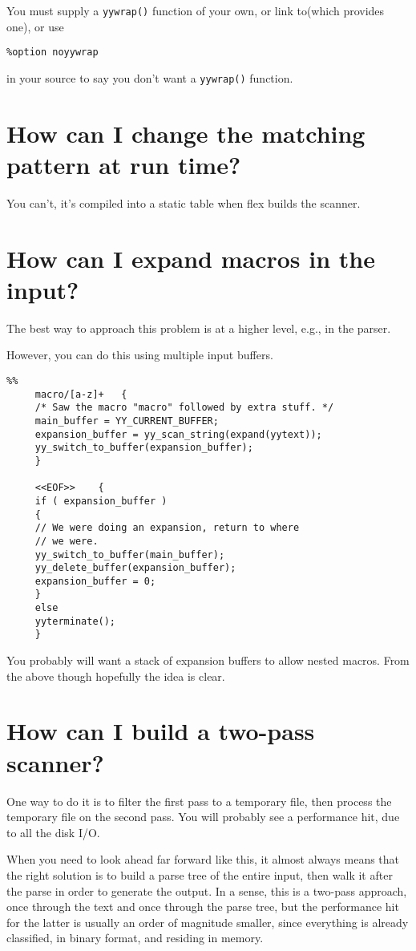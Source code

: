 \documentclass[openany,oneside]{book}
\begin{document}
You must supply a \verb`yywrap()` function of your own, or link to(which provides one), or use
\begin{verbatim}
%option noyywrap
\end{verbatim}


in your source to say you don't want a \verb`yywrap()` function.
\section{How can I change the matching pattern at run time?}


You can't, it's compiled into a static table when flex builds the scanner.
\section{How can I expand macros in the input?}


The best way to approach this problem is at a higher level, e.g., in the parser.

However, you can do this using multiple input buffers.
\begin{verbatim}
%%
     macro/[a-z]+	{
     /* Saw the macro "macro" followed by extra stuff. */
     main_buffer = YY_CURRENT_BUFFER;
     expansion_buffer = yy_scan_string(expand(yytext));
     yy_switch_to_buffer(expansion_buffer);
     }
     
     <<EOF>>	{
     if ( expansion_buffer )
     {
     // We were doing an expansion, return to where
     // we were.
     yy_switch_to_buffer(main_buffer);
     yy_delete_buffer(expansion_buffer);
     expansion_buffer = 0;
     }
     else
     yyterminate();
     }
\end{verbatim}


You probably will want a stack of expansion buffers to allow nested macros. 
From the above though hopefully the idea is clear.
\section{How can I build a two-pass scanner?}


One way to do it is to filter the first pass to a temporary file,
then process the temporary file on the second pass. You will probably see a
performance hit, due to all the disk I/O.

When you need to look ahead far forward like this, it almost always means
that the right solution is to build a parse tree of the entire input, then
walk it after the parse in order to generate the output.  In a sense, this
is a two-pass approach, once through the text and once through the parse
tree, but the performance hit for the latter is usually an order of magnitude
smaller, since everything is already classified, in binary format, and
residing in memory.
\end{document}
